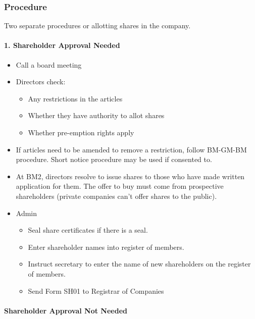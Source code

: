 \documentclass[
]{article}
\providecommand{\tightlist}{%
  \setlength{\itemsep}{0pt}\setlength{\parskip}{0pt}}
\begin{document}
\hypertarget{procedure}{%
\subsubsection{Procedure}\label{procedure}}

Two separate procedures or allotting shares in the company.

\hypertarget{shareholder-approval-needed}{%
\paragraph{1. Shareholder Approval
Needed}\label{shareholder-approval-needed}}

\begin{itemize}
\tightlist
\item
  Call a board meeting
\item
  Directors check:

  \begin{itemize}
  \tightlist
  \item
    Any restrictions in the articles
  \item
    Whether they have authority to allot shares
  \item
    Whether pre-emption rights apply
  \end{itemize}
\item
  If articles need to be amended to remove a restriction, follow
  BM-GM-BM procedure. Short notice procedure may be used if consented
  to.
\item
  At BM2, directors resolve to issue shares to those who have made
  written application for them. The offer to buy must come from
  prospective shareholders (private companies can't offer shares to the
  public).
\item
  Admin

  \begin{itemize}
  \tightlist
  \item
    Seal share certificates if there is a seal.
  \item
    Enter shareholder names into register of members.
  \item
    Instruct secretary to enter the name of new shareholders on the
    register of members.
  \item
    Send Form SH01 to Registrar of Companies
  \end{itemize}
\end{itemize}

\hypertarget{shareholder-approval-not-needed}{%
\paragraph{Shareholder Approval Not
Needed}\label{shareholder-approval-not-needed}}
\end{document}
